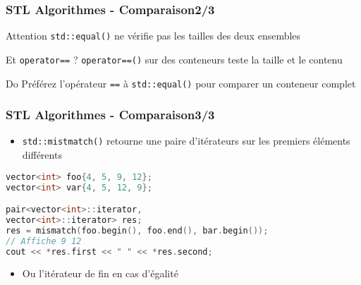 \documentclass[C++.tex]{subfiles}
\begin{document}
\begin{frame}[fragile]
	\frametitle{STL Algorithmes - Comparaison\titlehfill{}2/3}
	\begin{alertblock}{Attention}
		\lstinline|std::equal()| ne vérifie pas les tailles des deux ensembles
	\end{alertblock}


	\begin{block}{Et \lstinline|operator==| ?}
		\lstinline|operator==()| sur des conteneurs teste la taille et le contenu
	\end{block}

	\begin{exampleblock}{Do}
		Préférez l'opérateur \lstinline|==| à \lstinline|std::equal()| pour comparer un conteneur complet
	\end{exampleblock}
\end{frame}

\begin{frame}[fragile]
	\frametitle{STL Algorithmes - Comparaison\titlehfill{}3/3}
	\begin{itemize}
		\item \lstinline|std::mistmatch()| retourne une paire d'itérateurs sur les premiers éléments différents
	\end{itemize}

	\begin{lstlisting}[language=C++]
vector<int> foo{4, 5, 9, 12};
vector<int> var{4, 5, 12, 9};

pair<vector<int>::iterator,
vector<int>::iterator> res;
res = mismatch(foo.begin(), foo.end(), bar.begin());
// Affiche 9 12
cout << *res.first << " " << *res.second;\end{lstlisting}

	\begin{itemize}
		\item Ou l'itérateur de fin en cas d'égalité
	\end{itemize}
\end{frame}
\end{document}
